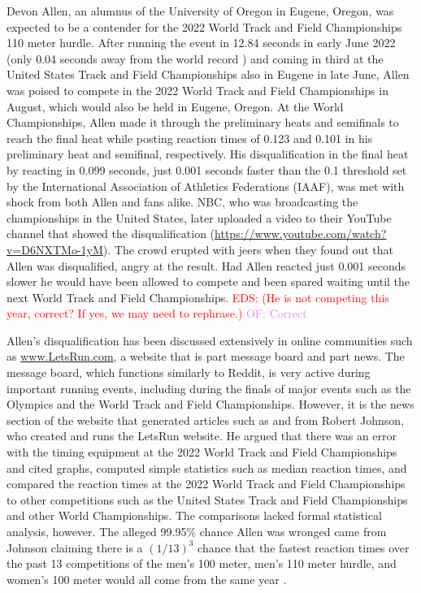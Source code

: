 \documentclass[12pt, letterpaper, titlepage]{article}
\newcommand{\eds}[1]{\textcolor{red}{EDS: (#1)}}
\newcommand{\of}[1]{\textcolor{violet}{OF: #1}}
\begin{document}
Devon Allen, an alumnus of the University of Oregon in Eugene, Oregon, was
expected to be a contender for the 2022 World Track and Field Championships 110 
meter hurdle.  After running the event in 12.84 seconds in early June 2022 
(only 0.04 seconds away from the world record \citep{wa2022preview}) and coming 
in third at the United States Track and Field Championships also in Eugene 
in late June, Allen was poised to compete in the 2022 World Track and 
Field Championships in August, which would also be held in Eugene, Oregon.
At the World Championships, Allen made it through the preliminary
heats and semifinals to reach the final heat while posting reaction times of 
0.123 and 0.101 in his preliminary heat and semifinal, respectively.  
His disqualification in the final heat by reacting in 0.099 seconds, just 0.001
seconds faster than the 0.1 threshold set by the International Association of
Athletics Federations (IAAF), was met
with shock from both Allen and fans alike.  NBC, who was broadcasting the
championships in the United States, later uploaded a video to their YouTube
channel that showed the disqualification
(\url{https://www.youtube.com/watch?v=D6NXTMo-1yM}).
The crowd erupted with jeers
when they found out that Allen was disqualified, angry at the result.  Had Allen 
reacted just 0.001 seconds slower he would have been allowed to compete and been 
spared waiting until the next World Track and Field Championships.
\eds{He is not competing this year, correct? If yes, we may need to rephrase.}
\of{Correct}


Allen's disqualification has been discussed extensively in online communities
such as \url{www.LetsRun.com}, a website that is part message board and part
news. The message board,
which functions similarly to Reddit, is very active during important running
events, including during the finals of major events such as
the Olympics and the World Track and Field Championships.  However, it is the
news section of the website that generated articles such as \citet{johnson2022data}
and \citet{johnson2022was} from  Robert Johnson, who created and runs 
the LetsRun website.  He argued that there was an error
with the timing equipment at the 2022 World Track and Field Championships and
cited graphs, computed simple statistics such as median reaction times, and 
compared the reaction times at the 2022 World Track and Field Championships to 
other competitions
such as the United States Track and Field Championships and other World Championships.
The comparisons lacked formal statistical analysis, however. 
The alleged 99.95\% chance Allen was wronged 
came from Johnson claiming there is a $(1/13)^3$ chance that the fastest 
reaction times over the past 13 competitions of the men's 100 meter, men's 110 
meter hurdle, and women's 100 meter would all come from the same year 
\citep{johnson2022was}.
\end{document}
